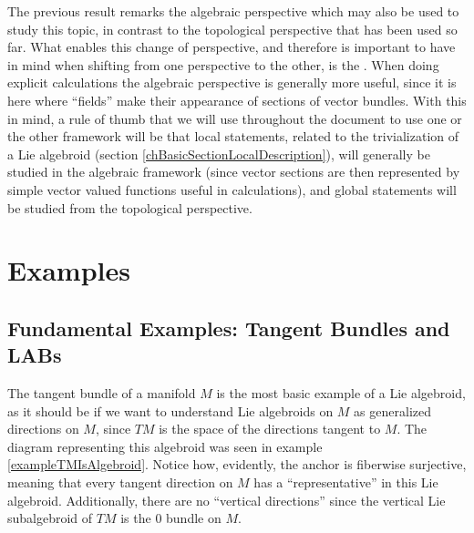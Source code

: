 The previous result remarks the algebraic perspective which may also be used to study this topic, in contrast to the topological perspective that has been used so far. What enables this change of perspective, and therefore is important to have in mind when shifting from one perspective to the other, is the  \cite{Tu2017}. When doing explicit calculations the algebraic perspective is generally more useful, since it is here where ``fields'' make their appearance of sections of vector bundles. With this in mind, a rule of thumb that we will use throughout the document to use one or the other framework will be that local statements, related to the trivialization of a Lie algebroid (section \ref{chBasicSectionLocalDescription}), will generally be studied in the algebraic framework (since vector sections are then represented by simple vector valued functions useful in calculations), and global statements will be studied from the topological perspective.

\section{Examples}

\subsection{Fundamental Examples: Tangent Bundles and LABs}

The tangent bundle of a manifold $M$ is the most basic example of a Lie algebroid, as it should be if we want to understand Lie algebroids on $M$ as generalized directions on $M$, since $TM$ is the space of the directions tangent to $M$. The diagram representing this algebroid was seen in example \ref{exampleTMIsAlgebroid}. 
Notice how, evidently, the anchor is fiberwise surjective, meaning that every tangent direction on $M$ has a ``representative'' in this Lie algebroid. Additionally, there are no ``vertical directions'' since the vertical Lie subalgebroid of $TM$ is the $0$ bundle on $M$.

